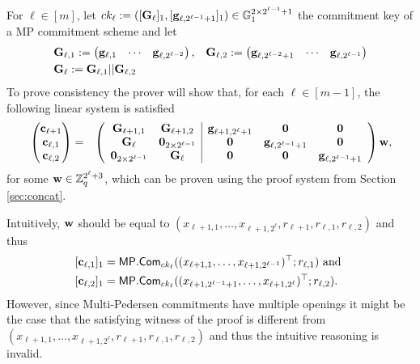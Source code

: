 For \(\ell\in[m]\), let \(ck_\ell:=([\mathbf{{G}}_\ell]_1,\allowbreak[\mathbf{g}_{\ell,2^{\ell-1}+1}]_1)\in\mathbb{G}_1^{2\times{2^{\ell-1}+1}}\) the commitment key of a MP commitment scheme and let
\begin{align*}
&\mathbf{{G}}_{\ell,1}:=
\begin{pmatrix}
    \mathbf{g}_{\ell,1}&\cdots&\mathbf{g}_{\ell,2^{\ell-2}}
\end{pmatrix},
&\mathbf{{G}}_{\ell,2}:=
\begin{pmatrix}
    \mathbf{g}_{\ell,2^{\ell-2}+1}&\cdots&\mathbf{g}_{\ell,2^{\ell-1}}
\end{pmatrix}\\
&\mathbf{{G}}_\ell:=\mathbf{{G}}_{\ell,1}||\mathbf{{G}}_{\ell,2}
\end{align*}
To prove consistency the prover will show that, for each $\ell\in [m-1]$, the following linear system is satisfied
{\begin{align}
&\begin{pmatrix}
\mathbf{c}_{\ell+1}\\
\mathbf{c}_{\ell,1}\\
\mathbf{c}_{\ell,2}
\end{pmatrix}
=
&\left(\begin{array}{cc|ccc}
\mathbf{{G}}_{\ell+1,1}           & \mathbf{{G}}_{\ell+1,2}            & \mathbf{g}_{\ell+1,2^\ell+1} & \mathbf{0}                     & \mathbf{0}\\
\mathbf{{G}}_{\ell}               & \mathbf{{0}}_{2\times2^{\ell-1}}   & \mathbf{0}                   & \mathbf{g}_{\ell,2^{\ell-1}+1} & \mathbf{0} \\
\mathbf{{0}}_{2\times 2^{\ell-1}} & \mathbf{{G}}_{\ell}                & \mathbf{0}                   & \mathbf{0}                     & \mathbf{g}_{\ell,2^{\ell-1}+1}
\end{array}\right)
\mathbf{w},\label{eq-log-split}
\end{align}}%
for some \(\mathbf{w}\in\mathbb{Z}_q^{2^\ell+3}\), which can be proven using the proof system from Section \ref{sec:concat}.

Intuitively, \(\mathbf{w}\) should be equal to \((x_{\ell+1,1},\ldots,x_{\ell+1,2^{\ell}},\allowbreak r_{\ell+1},r_{\ell,1},r_{\ell,2})\) and thus 
\begin{align*}
&[\mathbf{c}_{\ell,1}]_1=\mathsf{MP}.\mathsf{Com}_{ck_\ell}(\allowbreak(x_{\ell+1,1},\ldots,x_{\ell+1,2^{\ell-1}})^\top;r_{\ell,1})\text{ and }\\
&[\mathbf{c}_{\ell,2}]_1=\mathsf{MP}.\mathsf{Com}_{ck_\ell}((x_{\ell+1,2^{\ell-1}+1},\ldots, x_{\ell+1,2^{\ell}})^\top;r_{\ell,2}).
\end{align*}
However, since Multi-Pedersen commitments have multiple openings it might be the case that the satisfying witness of the proof is different from \((x_{\ell+1,1},\ldots,\allowbreak x_{\ell+1,2^\ell},r_{\ell+1},r_{\ell,1},r_{\ell,2})\) and thus the intuitive reasoning is invalid.

